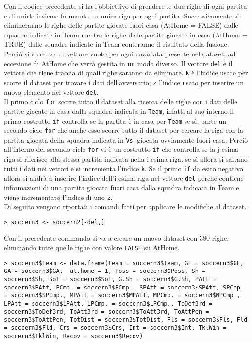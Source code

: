 Con il codice precedente si ha l'obbiettivo di prendere le due righe di ogni partita e di unirle insieme formando un unica riga per ogni partita. Successivamente si elimineranno le righe delle partite giocate fuori casa (\textsf{AtHome} = FALSE) dalle squadre indicate in \textsf{Team} mentre le righe delle partite giocate in casa (\textsf{AtHome} = TRUE) dalle squadre indicate in \textsf{Team} conteranno il risultato della fusione.\\
Perciò si è creato un vettore vuoto per ogni covariata presente nel dataset, ad eccezione di \textsf{AtHome} che verrà gestita in un modo diverso. Il vettore \texttt{del} è il vettore che tiene traccia di quali righe saranno da eliminare. \texttt{k} è l'indice usato per scorre il dataset per trovare i dati dell'avversario; \texttt{z} l'indice usato per inserire un nuovo elemento nel vettore \texttt{del}.\\
Il primo ciclo \texttt{for} scorre tutto il dataset alla ricerca delle righe con i dati delle partite giocate in casa dalla squadra indicata in \texttt{Team}, infatti al suo interno il primo costrutto \texttt{if} controlla se la partita è in casa per \texttt{Team} se sì, parte un secondo ciclo \texttt{for} che anche esso scorre tutto il dataset per cercare la riga con la partita giocata della squadra indicata in \texttt{Vs}; giocata ovviamente fuori casa. Perciò all'interno del secondo ciclo \texttt{for} vi è un costrutto \texttt{if} che controlla se la j-esima riga si riferisce alla stessa partita indicata nella i-esima riga, se sì allora si salvano tutti i dati nei vettori e si incrementa l'indice \texttt{k}. Se il primo \texttt{if} da esito negativo allora si andrà a inserire l'indice dell'i-esima riga nel vettore \texttt{del} perché contiene informazioni di una partita giocata fuori casa dalla squadra indicata in \textsf{Team} e viene incrementato l'indice di uno \texttt{z}.\\

Di seguito vengono riportati i comandi fatti per applicare le modifiche al dataset.
\bigskip
\begin{lstlisting}
> soccern3 <- soccern2[-del,]
\end{lstlisting}
\bigskip
\bigskip
Con il precedente commando si va a creare un nuovo dataset con 380 righe, eliminando tutte quelle righe con valore \texttt{FALSE} su \textsf{AtHome}. 
\bigskip
\begin{lstlisting}
> soccern3$Team <- data.frame(team = soccern3$Team, GF = soccern3$GF, GA = soccern3$GA,  at.home = 1, Poss = soccern3$Poss, Sh = soccern3$Sh, SoT = soccern3$SoT, G.Sh = soccern3$G.Sh, PAtt = soccern3$PAtt, PCmp. = soccern3$PCmp., SPAtt = soccern3$SPAtt, SPCmp. = soccern3$SPCmp., MPAtt = soccern3$MPAtt, MPCmp. = soccern3$MPCmp., LPAtt = soccern3$LPAtt, LPCmp. = soccern3$LPCmp., ToDef3rd = soccern3$ToDef3rd, ToAtt3rd = soccern3$ToAtt3rd, ToAttPen = soccern3$ToAttPen, TotDist = soccern3$TotDist, Fls = soccern3$Fls, Fld = soccern3$Fld, Crs = soccern3$Crs, Int = soccern3$Int, TklWin = soccern3$TklWin, Recov = soccern3$Recov)
	
\end{lstlisting}

